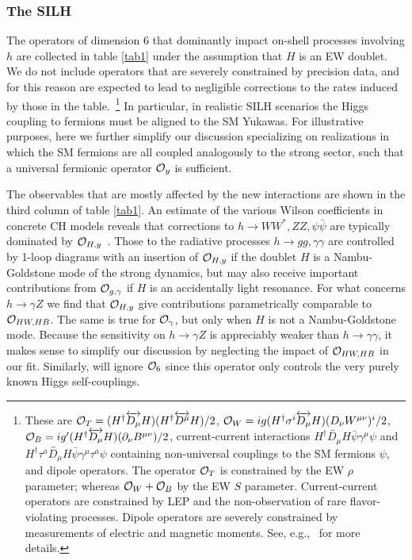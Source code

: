 \subsubsection{The SILH}

The operators of dimension 6 that dominantly impact on-shell processes involving $h$ are collected in table \ref{tab1} under the assumption that $H$ is an EW doublet. We do not include operators that are severely constrained by precision data, and for this reason are expected to lead to negligible corrections to the rates induced by those in the table.~\footnote{These are ${\cal O}_T=(H^\dagger\overleftrightarrow{D_\mu}H)(H^\dagger\overleftrightarrow{D^\mu}H)/2$, ${\cal O}_W={i}g(H^\dagger\sigma^i\overleftrightarrow{D_\mu} H)(D_\nu W^{\mu\nu})^i/2$, ${\cal O}_B=ig'(H^\dagger\overleftrightarrow{D_\mu} H)(\partial_\nu B^{\mu\nu})/2$, current-current interactions $H^\dagger \overleftrightarrow{D_\mu}H \bar \psi\gamma^\mu \psi$ and $H^\dagger \tau^a\overleftrightarrow{D_\mu}H \bar \psi\gamma^\mu \tau^a\psi$ containing non-universal couplings to the SM fermions $\psi$, and dipole operators. The operator ${\cal O}_T$ is constrained by the EW $\rho$ parameter; whereas ${\cal O}_W+{\cal O}_B$ by the EW $S$ parameter. Current-current operators are constrained by LEP and the non-observation of rare flavor-violating processes. Dipole operators are severely constrained by measurements of electric and magnetic moments. See, e.g.,~\cite{Contino:2013kra} for more details.%
} In particular, in realistic SILH scenarios the Higgs coupling to fermions must be aligned to the SM Yukawas. For illustrative purposes, here we further simplify our discussion specializing on realizations in which the SM fermions are all coupled analogously to the strong sector, such that a universal fermionic operator ${\cal O}_y$ is sufficient. 

The observables that are mostly affected by the new interactions are shown in the third column of table \ref{tab1}. An estimate of the various Wilson coefficients in concrete CH models reveals that corrections to $h\to WW^*,ZZ,\psi\bar\psi$ are typically dominated by ${\cal O}_{H,y}$~\cite{Giudice:2007fh}. Those to the radiative processes $h\to gg,\gamma\gamma$ are controlled by 1-loop diagrams with an insertion of ${\cal O}_{H,y}$ if the doublet $H$ is a Nambu-Goldstone mode of the strong dynamics, but may also receive important contributions from ${\cal O}_{g,\gamma}$ if $H$ is an accidentally light resonance. For what concerns $h\to\gamma Z$ we find that ${\cal O}_{H,y}$ give contributions parametrically comparable to ${\cal O}_{HW, HB}$. The same is true for ${\cal O}_{\gamma}$, but only when $H$ is not a Nambu-Goldstone mode. Because the sensitivity on $h\to\gamma Z$ is appreciably weaker than $h\to\gamma\gamma$, it makes sense to simplify our discussion by neglecting the impact of ${\cal O}_{HW, HB}$ in our fit. Similarly, will ignore ${\cal O}_6$ since this operator only controls the very purely known Higgs self-couplings.

